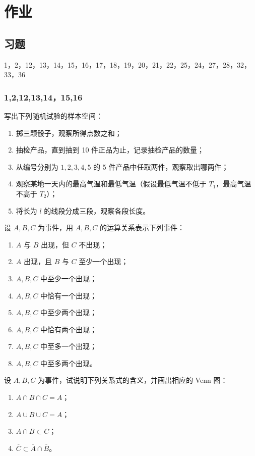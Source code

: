 \chapter{作业}
\section{习题}
\begin{proposition}[本章作业]1，2，12，13，14，15，16，17，18，19，20，21，22，25，24，27，28，32，33，36
    
\end{proposition}
\subsection{1,2,12,13,14，15,16}
\begin{exercise}
写出下列随机试验的样本空间：
\begin{enumerate}
  \item 掷三颗骰子，观察所得点数之和；
  \item 抽检产品，直到抽到 10 件正品为止，记录抽检产品的数量；
  \item 从编号分别为 $1,2,3,4,5$ 的 5 件产品中任取两件，观察取出哪两件；
  \item 观察某地一天内的最高气温和最低气温（假设最低气温不低于 $T_1$，最高气温不高于 $T_2$）；
  \item 将长为 $l$ 的线段分成三段，观察各段长度。
\end{enumerate}
\end{exercise}

\begin{exercise}
设 $A,B,C$ 为事件，用 $A,B,C$ 的运算关系表示下列事件：
\begin{enumerate}
  \item $A$ 与 $B$ 出现，但 $C$ 不出现；
  \item $A$ 出现，且 $B$ 与 $C$ 至少一个出现；
  \item $A,B,C$ 中至少一个出现；
  \item $A,B,C$ 中恰有一个出现；
  \item $A,B,C$ 中至少两个出现；
  \item $A,B,C$ 中恰有两个出现；
  \item $A,B,C$ 中至多一个出现；
  \item $A,B,C$ 中至多两个出现。
\end{enumerate}
\end{exercise}

\begin{exercise}
设 $A,B,C$ 为事件，试说明下列关系式的含义，并画出相应的 Venn 图：
\begin{enumerate}
  \item $A \cap B \cap C = A$；
  \item $A \cup B \cup C = A$；
  \item $A \cap B \subset C$；
  \item $\overline{C} \subset \overline{A} \cap \overline{B}$。
\end{enumerate}
\end{exercise}

